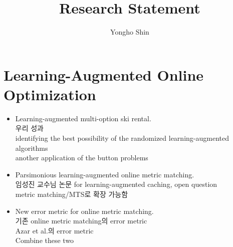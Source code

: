 \documentclass{article}
\title{Research Statement}
\author{Yongho Shin}
\date{}
\begin{document}
\maketitle


\section{Learning-Augmented Online Optimization}
\begin{itemize}
\item Learning-augmented multi-option ski rental. \\
우리 성과\\
identifying the best possibility of the randomized learning-augmented algorithms\\
another application of the button problems

\item Parsimonious learning-augmented online metric matching.\\
임성진 교수님 논문 for learning-augmented caching, open question\\
metric matching/MTS로 확장 가능함

\item New error metric for online metric matching. \\
기존 online metric matching의 error metric \\
Azar et al.의 error metric \\
Combine these two
\end{itemize}
\end{document}
